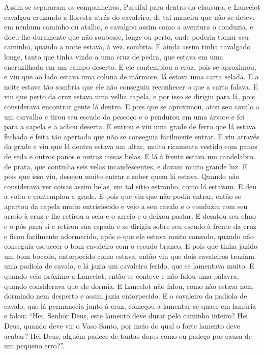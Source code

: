 Assim se separaram os companheiros, Parsifal para dentro da clausura, e
Lancelot cavalgou cruzando a floresta atrás do cavaleiro, de tal maneira que
não se deteve em nenhum caminho ou atalho, e cavalgou assim como a aventura o
conduzia, e doeu-lhe duramente que não soubesse, longe ou perto, onde poderia
tomar seu caminho, quando a noite estava, à vez, sombria. E ainda assim tinha
cavalgado longe, tanto que tinha vindo a uma cruz de pedra, que estava em uma
encruzilhada em um campo deserto. E ele contemplou a cruz, pois se aproximou, e
viu que ao lado estava uma coluna de mármore, lá estava uma carta selada. E a
noite estava tão sombria que ele não conseguiu reconhecer o que a carta falava.
E viu que perto da cruz estava uma velha capela, e por isso se dirigiu para lá,
pois considerava encontrar gente lá dentro. E pois que se aproximou, atou seu
cavalo a um carvalho e tirou seu escudo do pescoço e o pendurou em uma árvore e
foi para a capela e a achou deserta. E entrou e viu uma grade de ferro que lá
estava fechada e feita tão apertada que não se conseguia facilmente entrar. E
viu através da grade e viu que lá dentro estava um altar, muito ricamente
vestido com panos de seda e outros panos e outras coisas belas. E lá à frente
estava um candelabro de prata, que continha seis velas incandescentes, e davam
muito grande luz. E pois que isso viu, desejou muito entrar e saber quem lá
estava. Quando não considerava ver coisas assim belas, em tal sítio estranho,
como lá estavam. E deu a volta e contemplou a grade. E pois que viu que não
podia entrar, então se apartou da capela muito entristecido e veio a seu cavalo
e o conduziu com seu arreio à cruz e lhe retirou a sela e o arreio e o deixou
pastar. E desatou seu elmo e o pôs para si e retirou sua espada e se dirigiu
sobre seu escudo à frente da cruz e ficou facilmente adormecido, após o que ele
estava muito cansado, quando não conseguia esquecer o bom cavaleiro com o
escudo branco. E pois que tinha jazido um bom bocado, entorpecido como estava,
então viu que dois cavaleiros traziam uma padiola de cavalo, e lá jazia um
cavaleiro ferido, que se lamentava muito. E quando veio próximo a Lancelot,
então se conteve e não falou uma palavra, quando considerava que ele dormia. E
Lancelot não falou, como não estava nem dormindo nem desperto e assim jazia
entorpecido. E o cavaleiro da padiola de cavalo, que lá permanecia junto à
cruz, começou a lamentar-se quase em lamúria e falou: “Hei, Senhor Deus, este
lamento deve durar pelo caminho inteiro? Hei Deus, quando deve vir o Vaso
Santo, por meio do qual o forte lamento deve acabar? Hei Deus, alguém padece de
tantas dores como eu padeço por causa de um pequeno erro?”. 

